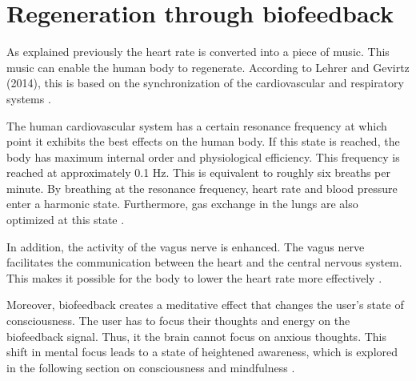 \section{Regeneration through biofeedback}

As explained previously the heart rate is converted into a piece of music. This music can enable the human body to regenerate. According to Lehrer and Gevirtz (2014), this is based on the synchronization of the cardiovascular and respiratory systems \cite{lehrer2014heart}.

The human cardiovascular system has a certain resonance frequency at which point it exhibits the best effects on the human body. If this state is reached, the body has maximum internal order and physiological efficiency. This frequency is reached at approximately 0.1 Hz. This is equivalent to roughly six breaths per minute. By breathing at the resonance frequency, heart rate and blood pressure enter a harmonic state. Furthermore, gas exchange in the lungs are also optimized at this state \cite{lehrer2014heart}.

In addition, the activity of the vagus nerve is enhanced. The vagus nerve facilitates  the communication between the heart and the central nervous system. This makes it possible for the body to lower the heart rate more effectively \cite{lehrer2014heart}.

Moreover, biofeedback creates a meditative effect that changes the user's state of consciousness. The user has to focus their thoughts and energy on the biofeedback signal. Thus, it the brain cannot focus on anxious thoughts. This shift in mental focus leads to a state of heightened awareness, which is explored in the following section on consciousness and mindfulness \cite{lehrer2014heart}.